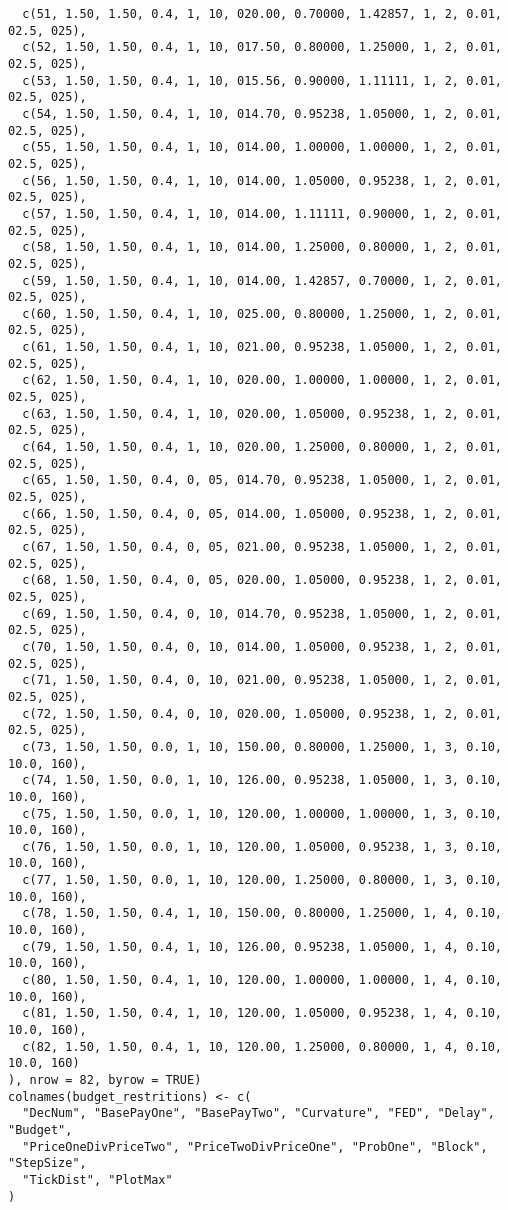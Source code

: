 \documentclass[12pt, a4paper, oneside]{article}
\theoremstyle{Plain}
\theoremstyle{Definition}
\theoremstyle{Remark}
\begin{document}
\begin{appendix}
\begin{lstlisting}
  c(51, 1.50, 1.50, 0.4, 1, 10, 020.00, 0.70000, 1.42857, 1, 2, 0.01, 02.5, 025),
  c(52, 1.50, 1.50, 0.4, 1, 10, 017.50, 0.80000, 1.25000, 1, 2, 0.01, 02.5, 025),
  c(53, 1.50, 1.50, 0.4, 1, 10, 015.56, 0.90000, 1.11111, 1, 2, 0.01, 02.5, 025),
  c(54, 1.50, 1.50, 0.4, 1, 10, 014.70, 0.95238, 1.05000, 1, 2, 0.01, 02.5, 025),
  c(55, 1.50, 1.50, 0.4, 1, 10, 014.00, 1.00000, 1.00000, 1, 2, 0.01, 02.5, 025),
  c(56, 1.50, 1.50, 0.4, 1, 10, 014.00, 1.05000, 0.95238, 1, 2, 0.01, 02.5, 025),
  c(57, 1.50, 1.50, 0.4, 1, 10, 014.00, 1.11111, 0.90000, 1, 2, 0.01, 02.5, 025),
  c(58, 1.50, 1.50, 0.4, 1, 10, 014.00, 1.25000, 0.80000, 1, 2, 0.01, 02.5, 025),
  c(59, 1.50, 1.50, 0.4, 1, 10, 014.00, 1.42857, 0.70000, 1, 2, 0.01, 02.5, 025),
  c(60, 1.50, 1.50, 0.4, 1, 10, 025.00, 0.80000, 1.25000, 1, 2, 0.01, 02.5, 025),
  c(61, 1.50, 1.50, 0.4, 1, 10, 021.00, 0.95238, 1.05000, 1, 2, 0.01, 02.5, 025),
  c(62, 1.50, 1.50, 0.4, 1, 10, 020.00, 1.00000, 1.00000, 1, 2, 0.01, 02.5, 025),
  c(63, 1.50, 1.50, 0.4, 1, 10, 020.00, 1.05000, 0.95238, 1, 2, 0.01, 02.5, 025),
  c(64, 1.50, 1.50, 0.4, 1, 10, 020.00, 1.25000, 0.80000, 1, 2, 0.01, 02.5, 025),
  c(65, 1.50, 1.50, 0.4, 0, 05, 014.70, 0.95238, 1.05000, 1, 2, 0.01, 02.5, 025),
  c(66, 1.50, 1.50, 0.4, 0, 05, 014.00, 1.05000, 0.95238, 1, 2, 0.01, 02.5, 025),
  c(67, 1.50, 1.50, 0.4, 0, 05, 021.00, 0.95238, 1.05000, 1, 2, 0.01, 02.5, 025),
  c(68, 1.50, 1.50, 0.4, 0, 05, 020.00, 1.05000, 0.95238, 1, 2, 0.01, 02.5, 025),
  c(69, 1.50, 1.50, 0.4, 0, 10, 014.70, 0.95238, 1.05000, 1, 2, 0.01, 02.5, 025),
  c(70, 1.50, 1.50, 0.4, 0, 10, 014.00, 1.05000, 0.95238, 1, 2, 0.01, 02.5, 025),
  c(71, 1.50, 1.50, 0.4, 0, 10, 021.00, 0.95238, 1.05000, 1, 2, 0.01, 02.5, 025),
  c(72, 1.50, 1.50, 0.4, 0, 10, 020.00, 1.05000, 0.95238, 1, 2, 0.01, 02.5, 025),
  c(73, 1.50, 1.50, 0.0, 1, 10, 150.00, 0.80000, 1.25000, 1, 3, 0.10, 10.0, 160),
  c(74, 1.50, 1.50, 0.0, 1, 10, 126.00, 0.95238, 1.05000, 1, 3, 0.10, 10.0, 160),
  c(75, 1.50, 1.50, 0.0, 1, 10, 120.00, 1.00000, 1.00000, 1, 3, 0.10, 10.0, 160),
  c(76, 1.50, 1.50, 0.0, 1, 10, 120.00, 1.05000, 0.95238, 1, 3, 0.10, 10.0, 160),
  c(77, 1.50, 1.50, 0.0, 1, 10, 120.00, 1.25000, 0.80000, 1, 3, 0.10, 10.0, 160),
  c(78, 1.50, 1.50, 0.4, 1, 10, 150.00, 0.80000, 1.25000, 1, 4, 0.10, 10.0, 160),
  c(79, 1.50, 1.50, 0.4, 1, 10, 126.00, 0.95238, 1.05000, 1, 4, 0.10, 10.0, 160),
  c(80, 1.50, 1.50, 0.4, 1, 10, 120.00, 1.00000, 1.00000, 1, 4, 0.10, 10.0, 160),
  c(81, 1.50, 1.50, 0.4, 1, 10, 120.00, 1.05000, 0.95238, 1, 4, 0.10, 10.0, 160),
  c(82, 1.50, 1.50, 0.4, 1, 10, 120.00, 1.25000, 0.80000, 1, 4, 0.10, 10.0, 160)
), nrow = 82, byrow = TRUE)
colnames(budget_restritions) <- c(
  "DecNum", "BasePayOne", "BasePayTwo", "Curvature", "FED", "Delay", "Budget",
  "PriceOneDivPriceTwo", "PriceTwoDivPriceOne", "ProbOne", "Block", "StepSize",
  "TickDist", "PlotMax"
)


\end{lstlisting}
\end{appendix}
\end{document}
